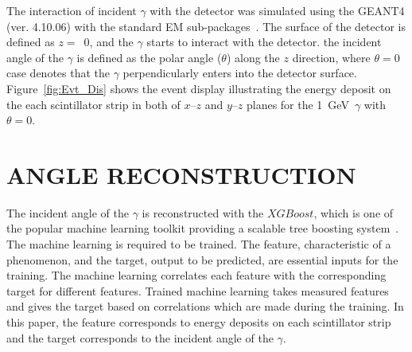 \documentclass[jkps,preprint,fleqn,showpacs,showkeys]{revtex4}
\newcommand{\XGB}{XGBoost}
\begin{document}
The interaction of incident $\gamma$ with the detector was simulated using the GEANT4 (ver. 4.10.06) with the standard EM sub-packages~\cite{GEANT4}. The surface of the detector is defined as $z=$~0, and the $\gamma$ starts to interact with the detector. the incident angle of the $\gamma$ is defined as the polar angle ($\theta$) along the $z$ direction, where $\theta = 0$ case denotes that the $\gamma$ perpendicularly enters into the detector surface. Figure~\ref{fig:Evt_Dis} shows the event display illustrating the energy deposit on the each scintillator strip in both of $x$--$z$ and $y$--$z$ planes for the 1~GeV~$\gamma$ with $\theta = 0$.



\section{ANGLE RECONSTRUCTION}
\label{sec:res}

The incident angle of the $\gamma$ is reconstructed with the $\XGB$, which is one of the popular machine learning toolkit providing a scalable tree boosting system~\cite{xgboost:2016}. The machine learning is required to be trained. The feature, characteristic of a phenomenon, and the target, output to be predicted, are essential inputs for the training. The machine learning correlates each feature with the corresponding target for different features. Trained machine learning takes measured features and gives the target based on correlations which are made during the training. In this paper, the feature corresponds to energy deposits on each scintillator strip and the target corresponds to the incident angle of the $\gamma$.
\end{document}
